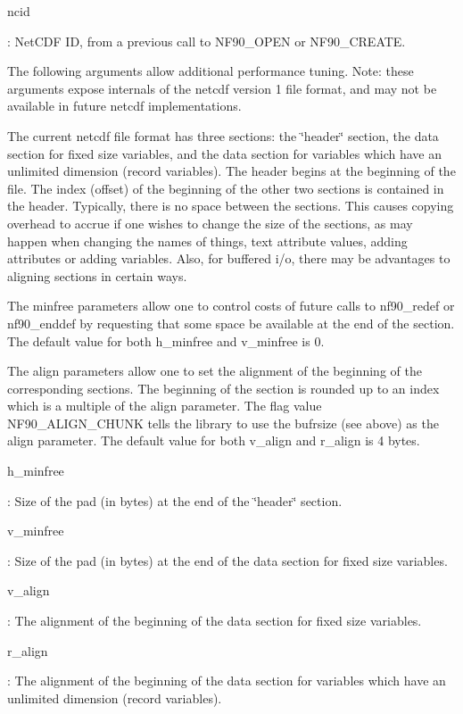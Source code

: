 {\ttfamily ncid}

\+: Net\+C\+DF ID, from a previous call to N\+F90\+\_\+\+O\+P\+EN or N\+F90\+\_\+\+C\+R\+E\+A\+TE.

The following arguments allow additional performance tuning. Note\+: these arguments expose internals of the netcdf version 1 file format, and may not be available in future netcdf implementations.

The current netcdf file format has three sections\+: the \char`\"{}header\char`\"{} section, the data section for fixed size variables, and the data section for variables which have an unlimited dimension (record variables). The header begins at the beginning of the file. The index (offset) of the beginning of the other two sections is contained in the header. Typically, there is no space between the sections. This causes copying overhead to accrue if one wishes to change the size of the sections, as may happen when changing the names of things, text attribute values, adding attributes or adding variables. Also, for buffered i/o, there may be advantages to aligning sections in certain ways.

The minfree parameters allow one to control costs of future calls to nf90\+\_\+redef or nf90\+\_\+enddef by requesting that some space be available at the end of the section. The default value for both h\+\_\+minfree and v\+\_\+minfree is 0.

The align parameters allow one to set the alignment of the beginning of the corresponding sections. The beginning of the section is rounded up to an index which is a multiple of the align parameter. The flag value N\+F90\+\_\+\+A\+L\+I\+G\+N\+\_\+\+C\+H\+U\+NK tells the library to use the bufrsize (see above) as the align parameter. The default value for both v\+\_\+align and r\+\_\+align is 4 bytes.

{\ttfamily h\+\_\+minfree}

\+: Size of the pad (in bytes) at the end of the \char`\"{}header\char`\"{} section.

{\ttfamily v\+\_\+minfree}

\+: Size of the pad (in bytes) at the end of the data section for fixed size variables.

{\ttfamily v\+\_\+align}

\+: The alignment of the beginning of the data section for fixed size variables.

{\ttfamily r\+\_\+align}

\+: The alignment of the beginning of the data section for variables which have an unlimited dimension (record variables).

